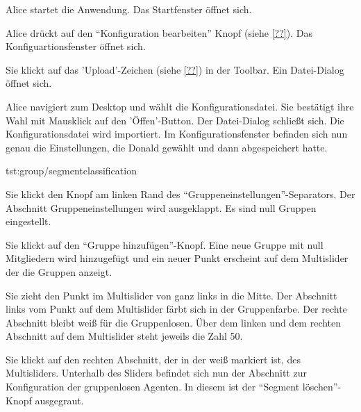 \documentclass[parskip=full,11pt]{scrartcl}
\begin{document}
{Alice startet die Anwendung.}
{Das Startfenster öffnet sich.}

{Alice drückt auf den \enquote{Konfiguration bearbeiten} Knopf (siehe \cref{??}).}
{Das Konfiguartionsfenster öffnet sich.}

{Sie klickt auf das 'Upload'-Zeichen (siehe \cref{??}) in der Toolbar.}
{Ein Datei-Dialog öffnet sich.}

\teststep{}
{Alice navigiert zum Desktop und wählt die Konfigurationsdatei. Sie bestätigt ihre Wahl mit Mausklick auf den 'Öffen'-Button.}
{Der Datei-Dialog schließt sich. Die Konfigurationsdatei wird importiert. Im Konfigurationsfenster befinden sich nun genau die Einstellungen, die Donald gewählt und dann abgespeichert hatte.}

{tst:group/segmentclassification}

{Sie klickt den Knopf am linken Rand des \enquote{Gruppeneinstellungen}-Separators.}
{Der Abschnitt Gruppeneinstellungen wird ausgeklappt. Es sind null Gruppen eingestellt.}

{Sie klickt auf den \enquote{Gruppe hinzufügen}-Knopf.}
{Eine neue Gruppe mit null Mitgliedern wird hinzugefügt und ein neuer Punkt erscheint auf dem Multislider der die Gruppen anzeigt.}

{Sie zieht den Punkt im Multislider von ganz links in die Mitte.}
{Der Abschnitt links vom Punkt auf dem Multislider färbt sich in der Gruppenfarbe. Der rechte Abschnitt bleibt weiß für die Gruppenlosen. Über dem linken und dem rechten Abschnitt auf dem Multislider steht jeweils die Zahl 50.}

{Sie klickt auf den rechten Abschnitt, der in der weiß markiert ist, des Multisliders.}
{Unterhalb des Sliders befindet sich nun der Abschnitt zur Konfiguration der gruppenlosen Agenten. In diesem ist der \enquote{Segment löschen}-Knopf ausgegraut.}
\end{document}
